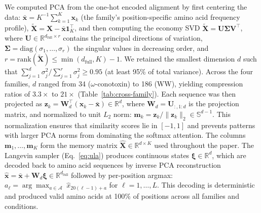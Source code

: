 We computed PCA from the one-hot encoded alignment by first centering the data:
$\bar{\mathbf{x}} = K^{-1}\sum_{k=1}^K \mathbf{x}_k$ (the family's
position-specific amino acid frequency profile),
$\tilde{\mathbf{X}} = \mathbf{X} - \bar{\mathbf{x}}\mathbf{1}_K^\top$,
and then computing the economy SVD
$\tilde{\mathbf{X}} = \mathbf{U}\boldsymbol{\Sigma}\mathbf{V}^\top$, where
$\mathbf{U} \in \mathbb{R}^{d_{\mathrm{full}} \times r}$ contains the
principal directions of variation,
$\boldsymbol{\Sigma} = \mathrm{diag}(\sigma_1, \ldots, \sigma_r)$ the
singular values in decreasing order, and
$r = \mathrm{rank}(\tilde{\mathbf{X}}) \leq \min(d_{\mathrm{full}}, K) - 1$.
We retained the smallest dimension $d$ such that
$\sum_{j=1}^d \sigma_j^2 / \sum_{j=1}^r \sigma_j^2 \geq 0.95$ (at least
95\% of total variance). Across the four families, $d$ ranged from 34
($\omega$-conotoxin) to 186 (WW), yielding compression ratios of
$3.3\times$ to $21\times$ (Table~\ref{tab:cross-family}). Each sequence was
then projected as
$\mathbf{z}_k = \mathbf{W}_d^\top(\mathbf{x}_k - \bar{\mathbf{x}})
\in \mathbb{R}^d$, where
$\mathbf{W}_d = \mathbf{U}_{:,1:d}$ is the projection matrix, and
normalized to unit $L_2$ norm:
$\mathbf{m}_k = \mathbf{z}_k / \|\mathbf{z}_k\|_2 \in \mathbb{S}^{d-1}$.
This normalization ensures that similarity scores lie in $[-1, 1]$ and
prevents patterns with larger PCA norms from dominating the softmax attention.
The columns $\mathbf{m}_1, \ldots, \mathbf{m}_K$ form the memory matrix
$\hat{\mathbf{X}} \in \mathbb{R}^{d \times K}$ used throughout the paper.
The Langevin sampler (Eq.~\ref{eq:ula}) produces continuous states
$\boldsymbol{\xi} \in \mathbb{R}^d$, which are decoded back to amino acid
sequences by inverse PCA reconstruction
$\hat{\mathbf{x}} = \bar{\mathbf{x}} + \mathbf{W}_d\boldsymbol{\xi}
\in \mathbb{R}^{d_{\mathrm{full}}}$ followed by per-position argmax:
$a_\ell = \arg\max_{a \in \mathcal{A}}\; \hat{x}_{20(\ell-1) + a}$ for
$\ell = 1, \ldots, L$. This decoding is deterministic and produced valid
amino acids at 100\% of positions across all families and conditions.

